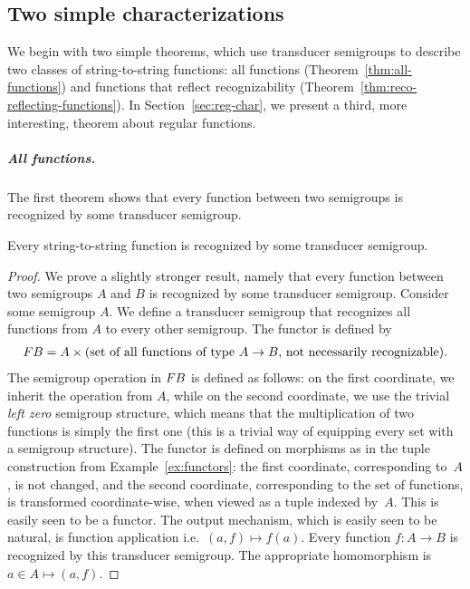 



\subsection{Two simple characterizations}
We begin with two simple theorems, which  use transducer semigroups to describe two classes of string-to-string functions:  all functions (Theorem~\ref{thm:all-functions}) and functions that reflect recognizability (Theorem~\ref{thm:reco-reflecting-functions}).
In  Section~\ref{sec:reg-char}, we present a third, more  interesting, theorem about  regular functions.

\subparagraph{All functions.} The first theorem shows that every function between two semigroups is recognized by some transducer semigroup.

\begin{theorem}\label{thm:all-functions} 
     Every string-to-string function is recognized  by some transducer semigroup.
\end{theorem}
\begin{proof}
    We prove a slightly stronger result, namely that every function between two semigroups $A$ and $B$ is recognized by some transducer semigroup.
    Consider some semigroup $A$. We define a transducer semigroup that recognizes all functions from $A$ to every other semigroup. The functor is defined by 
    \begin{align*}
        \functor B = A \times \text{(set of all functions of type $A \to B$, not necessarily recognizable)}.
    \end{align*}
    The semigroup operation in $\functor B$ is defined as follows: on the first coordinate, we inherit the operation from $A$, while on the second coordinate, we use the trivial \emph{left zero} semigroup structure, which means that the multiplication of two functions is simply the first one (this is a trivial way of equipping every set with a semigroup structure).   The functor is defined on morphisms
as in the tuple construction from Example~\ref{ex:functors}: the first coordinate, corresponding to~$A$, is not changed, and the second coordinate, corresponding to the set of functions, is transformed   coordinate-wise, when viewed as a tuple indexed by~$A$.   This is easily seen to be a functor. The output mechanism, which is easily seen to be natural, is function application i.e.~$(a,f) \mapsto f(a)$.
Every function $f : A \to B$ is recognized by this transducer semigroup.  The appropriate homomorphism  is~$a \in A  \mapsto  (a,f)$.
\end{proof}

